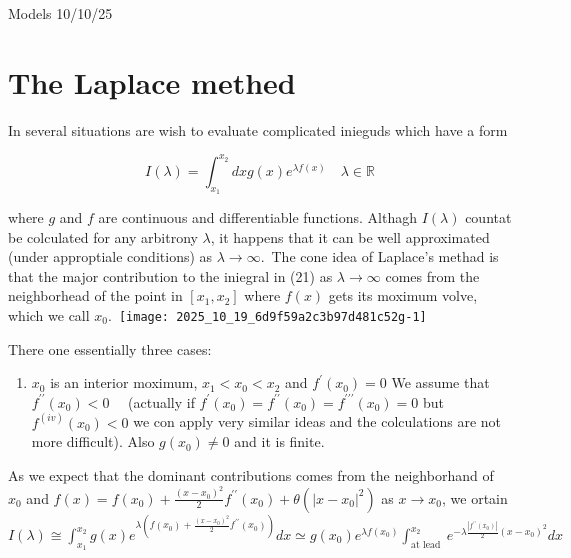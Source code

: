 Models 10/10/25

\section*{The Laplace methed}
In several situations are wish to evaluate complicated inieguds which have a form


\begin{equation*}
I(\lambda)=\int_{x_{1}}^{x_{2}} d x g(x) e^{\lambda f(x)} \quad \lambda \in \mathbb{R} \tag{21}
\end{equation*}


where $g$ and $f$ are continuous and differentiable functions. Althagh $I(\lambda)$ countat be colculated for any arbitrony $\lambda$, it happens that it can be well approximated (under approptiale conditions) as $\lambda \rightarrow \infty$.\
The cone idea of Laplace's methad is that the major contribution to the iniegral in (21) as $\lambda \rightarrow \infty$ comes from the neighborhead of the point in $\left[x_{1}, x_{2}\right]$ where $f(x)$ gets its moximum volve, which we call $x_{0}$.\
\texttt{[image: 2025\_10\_19\_6d9f59a2c3b97d481c52g-1]}

There one essentially three cases:

\begin{enumerate}
  \item $x_{0}$ is an interior moximum, $x_{1}<x_{0}<x_{2}$ and $f^{\prime}\left(x_{0}\right)=0$ We assume that $f^{\prime \prime}\left(x_{0}\right)<0 \quad$ (actually if $f^{\prime}\left(x_{0}\right)=f^{\prime \prime}\left(x_{0}\right)=f^{\prime \prime \prime}\left(x_{0}\right)=0$ but $f^{(i v)}\left(x_{0}\right)<0$ we con apply very similar ideas and the colculations are not more difficult). Also $g\left(x_{0}\right) \neq 0$
and it is finite.
\end{enumerate}

As we expect that the dominant contributions comes from the neighborhand of $x_{0}$ and $f(x)=f\left(x_{0}\right)+\frac{\left(x-x_{0}\right)^{2}}{2} f^{\prime \prime}\left(x_{0}\right) +\theta\left(\left|x-x_{0}\right|^{2}\right)$ as $x \rightarrow x_{0}$, we ortain
$I(\lambda) \cong \int_{x_{1}}^{x_{2}} g(x) e^{\lambda\left(f\left(x_{0}\right)+\frac{\left(x-x_{0}\right)^{2}}{2} f^{\prime \prime}\left(x_{0}\right)\right)} d x \simeq g\left(x_{0}\right) e^{\lambda f\left(x_{0}\right)} \int_{\text {at lead }}^{x_{2}} e^{-\lambda \frac{\left|f^{\prime \prime}\left(x_{0}\right)\right|}{2}\left(x-x_{0}\right)^{2}} d x$

